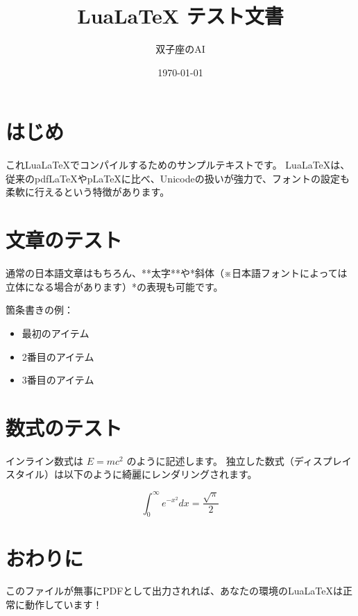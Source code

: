 \documentclass[11pt,a4paper]{ltjsarticle}
\title{LuaLaTeX テスト文書}
\author{双子座のAI}
\date{\today}
\begin{document}
\maketitle

\tableofcontents
\clearpage

\section{はじめ}
これLuaLaTeXでコンパイルするためのサンプルテキストです。
LuaLaTeXは、従来のpdfLaTeXやpLaTeXに比べ、Unicodeの扱いが強力で、フォントの設定も柔軟に行えるという特徴があります。

\section{文章のテスト}
通常の日本語文章はもちろん、**太字**や*斜体（※日本語フォントによっては立体になる場合があります）*の表現も可能です。

箇条書きの例：
\begin{itemize}
    \item 最初のアイテム
    \item 2番目のアイテム
    \item 3番目のアイテム
\end{itemize}

\section{数式のテスト}
インライン数式は $E = mc^2$ のように記述します。
独立した数式（ディスプレイスタイル）は以下のように綺麗にレンダリングされます。

\begin{equation}
    \int_{0}^{\infty} e^{-x^2} dx = \frac{\sqrt{\pi}}{2}
\end{equation}

\section{おわりに}
このファイルが無事にPDFとして出力されれば、あなたの環境のLuaLaTeXは正常に動作しています！
\end{document}
